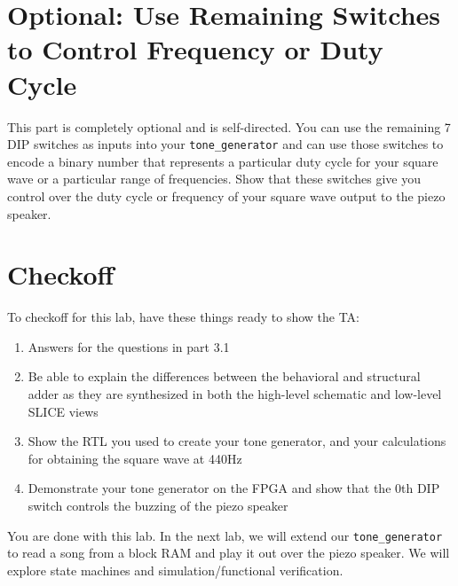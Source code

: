 \documentclass[11pt]{article}
\begin{document}
\section{Optional: Use Remaining Switches to Control Frequency or Duty Cycle}
This part is completely optional and is self-directed. You can use the remaining 7 DIP switches as inputs into your \verb|tone_generator| and can use those switches to encode a binary number that represents a particular duty cycle for your square wave or a particular range of frequencies. Show that these switches give you control over the duty cycle or frequency of your square wave output to the piezo speaker.

\section{Checkoff}
To checkoff for this lab, have these things ready to show the TA:

\begin{enumerate}
	\item Answers for the questions in part 3.1
	\item Be able to explain the differences between the behavioral and structural adder as they are synthesized in both the high-level schematic and low-level SLICE views
	\item Show the RTL you used to create your tone generator, and your calculations for obtaining the square wave at 440Hz
	\item Demonstrate your tone generator on the FPGA and show that the 0th DIP switch controls the buzzing of the piezo speaker
\end{enumerate}

You are done with this lab. In the next lab, we will extend our \verb|tone_generator| to read a song from a block RAM and play it out over the piezo speaker. We will explore state machines and simulation/functional verification.

\end{document}
